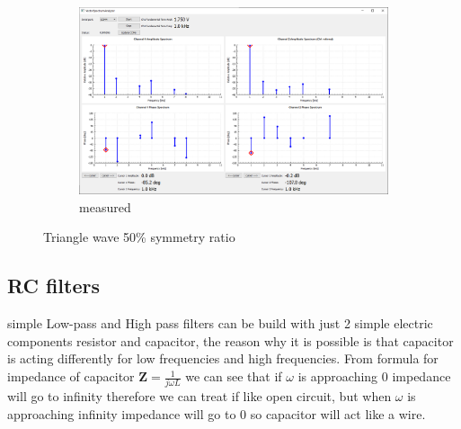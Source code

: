 \documentclass[notitlepage, a4paper, 11pt]{article}
\begin{document}
\begin{figure}[H]
\begin{subfigure}[][][t]{0.3\textwidth}
			\includegraphics[width=\textwidth, trim=10 80 555 100, clip]{../img/Circuit1/trig50}
			\caption{measured}
			\label{fig:meas-signal-d}
		\end{subfigure}
		\caption{Triangle wave 50\% symmetry ratio}
		\label{fig:pure-sin}
	\end{figure}
		
	\subsection{RC filters}
	
	simple Low-pass and High pass filters can be build with just 2 simple electric components resistor and capacitor, the reason why it is possible is that capacitor is acting differently for low frequencies and high frequencies. From formula for impedance of capacitor $\mathbf{Z}=\frac{1}{j\omega L}$ we can see that if $\omega$ is approaching 0 impedance will go to infinity therefore we can treat if like open circuit, but when $\omega$ is approaching infinity impedance will go to 0 so capacitor will act like a wire.
	
\end{document}

